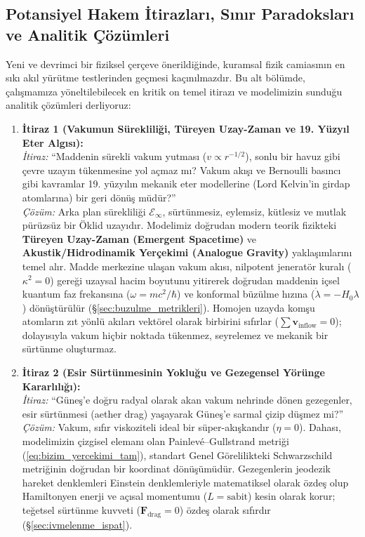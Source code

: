 \subsection{Potansiyel Hakem İtirazları, Sınır Paradoksları ve Analitik Çözümleri}
\label{sec:hakem_itirazlari}

Yeni ve devrimci bir fiziksel çerçeve önerildiğinde, kuramsal fizik camiasının en sıkı akıl yürütme testlerinden geçmesi kaçınılmazdır. Bu alt bölümde, çalışmamıza yöneltilebilecek en kritik on temel itirazı ve modelimizin sunduğu analitik çözümleri derliyoruz:

\begin{enumerate}
    \item \textbf{İtiraz 1 (Vakumun Sürekliliği, Türeyen Uzay-Zaman ve 19. Yüzyıl Eter Algısı):} \\
          \textit{İtiraz:} ``Maddenin sürekli vakum yutması ($v \propto r^{-1/2}$), sonlu bir havuz gibi çevre uzayın tükenmesine yol açmaz mı? Vakum akışı ve Bernoulli basıncı gibi kavramlar 19. yüzyılın mekanik eter modellerine (Lord Kelvin'in girdap atomlarına) bir geri dönüş müdür?'' \\
          \textit{Çözüm:} Arka plan sürekliliği $\mathcal{E}_\infty$, sürtünmesiz, eylemsiz, kütlesiz ve mutlak pürüzsüz bir Öklid uzayıdır. Modelimiz doğrudan modern teorik fizikteki \textbf{Türeyen Uzay-Zaman (Emergent Spacetime)} ve \textbf{Akustik/Hidrodinamik Yerçekimi (Analogue Gravity)} yaklaşımlarını temel alır. Madde merkezine ulaşan vakum akısı, nilpotent jeneratör kuralı ($\kappa^2 = 0$) gereği uzaysal hacim boyutunu yitirerek doğrudan maddenin içsel kuantum faz frekansına ($\omega = mc^2/\hbar$) ve konformal büzülme hızına ($\dot{\lambda} = -H_0 \lambda$) dönüştürülür (\S\ref{sec:buzulme_metrikleri}). Homojen uzayda komşu atomların zıt yönlü akıları vektörel olarak birbirini sıfırlar ($\sum \mathbf{v}_{\mathrm{inflow}} = 0$); dolayısıyla vakum hiçbir noktada tükenmez, seyrelemez ve mekanik bir sürtünme oluşturmaz.

    \item \textbf{İtiraz 2 (Esir Sürtünmesinin Yokluğu ve Gezegensel Yörünge Kararlılığı):} \\
          \textit{İtiraz:} ``Güneş'e doğru radyal olarak akan vakum nehrinde dönen gezegenler, esir sürtünmesi (aether drag) yaşayarak Güneş'e sarmal çizip düşmez mi?'' \\
          \textit{Çözüm:} Vakum, sıfır viskoziteli ideal bir süper-akışkandır ($\eta = 0$). Dahası, modelimizin çizgisel elemanı olan Painlev\'e--Gullstrand metriği (\ref{eq:bizim_yercekimi_tam}), standart Genel Görelilikteki Schwarzschild metriğinin doğrudan bir koordinat dönüşümüdür. Gezegenlerin jeodezik hareket denklemleri Einstein denklemleriyle matematiksel olarak özdeş olup Hamiltonyen enerji ve açısal momentumu ($L = \text{sabit}$) kesin olarak korur; teğetsel sürtünme kuvveti ($\mathbf{F}_{\mathrm{drag}} = 0$) özdeş olarak sıfırdır (\S\ref{sec:ivmelenme_ispat}).


\end{enumerate}
